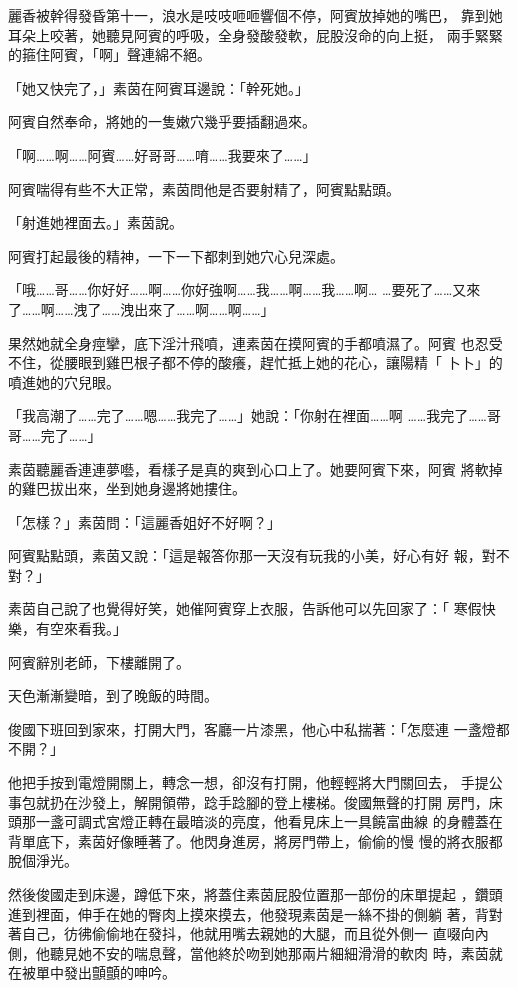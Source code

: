 麗香被幹得發昏第十一，浪水是吱吱咂咂響個不停，阿賓放掉她的嘴巴，
靠到她耳朵上咬著，她聽見阿賓的呼吸，全身發酸發軟，屁股沒命的向上挺，
兩手緊緊的箍住阿賓，「啊」聲連綿不絕。

「她又快完了，」素茵在阿賓耳邊說：「幹死她。」

阿賓自然奉命，將她的一隻嫩穴幾乎要插翻過來。

「啊……啊……阿賓……好哥哥……唷……我要來了……」

阿賓喘得有些不大正常，素茵問他是否要射精了，阿賓點點頭。

「射進她裡面去。」素茵說。

阿賓打起最後的精神，一下一下都刺到她穴心兒深處。

「哦……哥……你好好……啊……你好強啊……我……啊……我……啊…
…要死了……又來了……啊……洩了……洩出來了……啊……啊……」

果然她就全身痙攣，底下淫汁飛噴，連素茵在摸阿賓的手都噴濕了。阿賓
也忍受不住，從腰眼到雞巴根子都不停的酸癢，趕忙抵上她的花心，讓陽精「
卜卜」的噴進她的穴兒眼。

「我高潮了……完了……嗯……我完了……」她說：「你射在裡面……啊
……我完了……哥哥……完了……」

素茵聽麗香連連夢囈，看樣子是真的爽到心口上了。她要阿賓下來，阿賓
將軟掉的雞巴拔出來，坐到她身邊將她摟住。

「怎樣？」素茵問：「這麗香姐好不好啊？」

阿賓點點頭，素茵又說：「這是報答你那一天沒有玩我的小美，好心有好
報，對不對？」

素茵自己說了也覺得好笑，她催阿賓穿上衣服，告訴他可以先回家了：「
寒假快樂，有空來看我。」

阿賓辭別老師，下樓離開了。

天色漸漸變暗，到了晚飯的時間。

俊國下班回到家來，打開大門，客廳一片漆黑，他心中私揣著：「怎麼連
一盞燈都不開？」

他把手按到電燈開關上，轉念一想，卻沒有打開，他輕輕將大門關回去，
手提公事包就扔在沙發上，解開領帶，踗手踗腳的登上樓梯。俊國無聲的打開
房門，床頭那一盞可調式宮燈正轉在最暗淡的亮度，他看見床上一具饒富曲線
的身體蓋在背單底下，素茵好像睡著了。他閃身進房，將房門帶上，偷偷的慢
慢的將衣服都脫個淨光。

然後俊國走到床邊，蹲低下來，將蓋住素茵屁股位置那一部份的床單提起
，鑽頭進到裡面，伸手在她的臀肉上摸來摸去，他發現素茵是一絲不掛的側躺
著，背對著自己，彷彿偷偷地在發抖，他就用嘴去親她的大腿，而且從外側一
直啜向內側，他聽見她不安的喘息聲，當他終於吻到她那兩片細細滑滑的軟肉
時，素茵就在被單中發出顫顫的呻吟。

